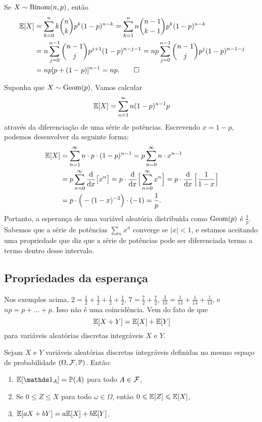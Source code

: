 \begin{example}
[Binomial]
\label{example:bernoulliesp}
Se $X\sim \mathrm{Binom}(n,p)$, então
\begin{align}
\mathbb{E} [X]
&
= \sum_{k=0}^n k \binom{n}{k} p^k (1-p)^{n-k}
= \sum_{k=1}^n n \binom{n-1}{k-1} p^k (1-p)^{n-k}
\\ &
= n \sum_{j=0}^{n-1} \binom{n-1}{j} p^{j+1} (1-p)^{n-j-1} = np \sum_{j=0}^{n-1} \binom{n-1}{j} p^{j} (1-p)^{n-1-j}
\\ &
= np [p + (1-p)]^{n-1}
= np.
\qedhere
\end{align}
\end{example}

\begin{example}
[Geométrica]
Suponha que $X\sim \mathrm{Geom}(p)$.
Vamos calcular
\[
\mathbb{E}[X] = \sum_{n=1}^{\infty} n (1-p)^{n-1}p
\]
através da diferenciação de uma série de potências.
Escrevendo $ x = 1-p $, podemos desenvolver da seguinte forma:
\begin{align}
\mathbb{E}[X]
&=
\sum_{n=1}^\infty n \cdot p \cdot (1-p)^{n-1}
=
p
\sum_{n=0}^\infty n \cdot x^{n-1}
\\
&
=
p
\sum_{n=0}^\infty \frac{\mathrm{d}}{\mathrm{d} x} \big[x^n\big]
=
p
\cdot
\frac{\mathrm{d}}{\mathrm{d} x} \Big[\sum_{n=0}^\infty x^n \Big]
=
p
\cdot
\frac{\mathrm{d}}{\mathrm{d} x} \, \Big[\frac{1}{1-x}\Big]
\\
&
=
p \cdot \Big(- (1-x)^{-2} \Big) \cdot (-1)
=
\frac{1}{p}.
\end{align}
Portanto, a esperança de uma variável aleatória distribuída como $\mathrm{Geom}(p)$ é $\frac{1}{p}$.
Sabemos que a série de potências $ \sum_n x^n $ converge se $ |x|<1 $, e estamos aceitando uma propriedade que diz que a série de potências pode ser diferenciada termo a termo dentro desse intervalo.
\end{example}

\subsection{Propriedades da esperança}

Nos exemplos acima,
$
2
=
\frac{1}{2}
+
\frac{1}{2}
+
\frac{1}{2}
+
\frac{1}{2}
$,
$
7
=
\frac{7}{2}
+
\frac{7}{2}
$,
$
\frac{3}{13}
=
\frac{1}{13}
+
\frac{1}{13}
+
\frac{1}{13}
$,
e
$ np = p+\dots + p $.
Isso não é uma coincidência.
Vem do fato de que
\[
\mathbb{E}[X+Y]
=
\mathbb{E}[X]
+
\mathbb{E}[Y]
\]
para variáveis aleatórias discretas integráveis $ X $ e $ Y $.

\begin{theorem}
Sejam $ X $ e $ Y $ variáveis aleatórias discretas integráveis definidas no mesmo espaço de probabilidade $ (\Omega, \mathcal F, \mathbb{P}) $.
Então:
\begin{enumerate}[$(1)$]
\item
$ \E[\I_A] = \Pb(A) $ para todo $ A \in \mathcal F $,
\item
Se $ 0 \leq Z \leq X $ para todo $ \omega\in\Omega $, então $ 0 \leqslant \mathbb{E}[Z] \leqslant \mathbb{E}[X] $,
\item
$ \mathbb{E}[aX + bY] = a\mathbb{E}[X] + b\mathbb{E}[Y] $.
\end{enumerate}
\end{theorem}

